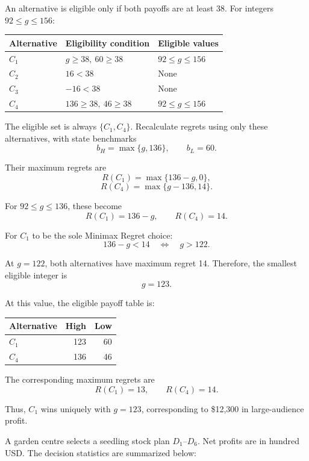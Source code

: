 An alternative is eligible only if both payoffs
are at least 38. For integers $92\le g\le156$:

\begin{center}
\begin{tabular}{lll}\toprule
Alternative & Eligibility condition & Eligible values\\\midrule
$C_1$ & $g\ge38,\ 60\ge38$ & $92\le g\le156$\\
$C_2$ & $16<38$ & None\\
$C_3$ & $-16<38$ & None\\
$C_4$ & $136\ge38,\ 46\ge38$ & $92\le g\le156$\\
\bottomrule
\end{tabular}
\end{center}

The eligible set is always $\{C_1,C_4\}$.
Recalculate regrets using only these alternatives,
with state benchmarks
\[
b_H=\max\{g,136\},\qquad b_L=60.
\]

Their maximum regrets are
\[
R(C_1)=\max\{136-g,0\},
\]
\[
R(C_4)=\max\{g-136,14\}.
\]

For $92\le g\le136$, these become
\[
R(C_1)=136-g,\qquad R(C_4)=14.
\]

For $C_1$ to be the sole Minimax Regret choice:
\[
136-g<14
\quad\Longleftrightarrow\quad g>122.
\]

At $g=122$, both alternatives have maximum regret 14.
Therefore, the smallest eligible integer is
\[
\boxed{g=123}.
\]

At this value, the eligible payoff table is:

\begin{center}\small\setlength{\tabcolsep}{4pt}
\begin{tabular}{lrr}\toprule
Alternative & High & Low\\ \midrule
$C_1$ & 123 & 60\\
$C_4$ & 136 & 46\\
\bottomrule
\end{tabular}
\end{center}

The corresponding maximum regrets are
\[
R(C_1)=13,\qquad R(C_4)=14.
\]

Thus, $C_1$ wins uniquely with $g=123$,
corresponding to \$12,300 in large-audience profit.
\secInicio[sec:q2]



A garden centre selects a seedling stock plan $D_1$--$D_6$. Net profits are in hundred USD. The decision statistics are summarized below:

